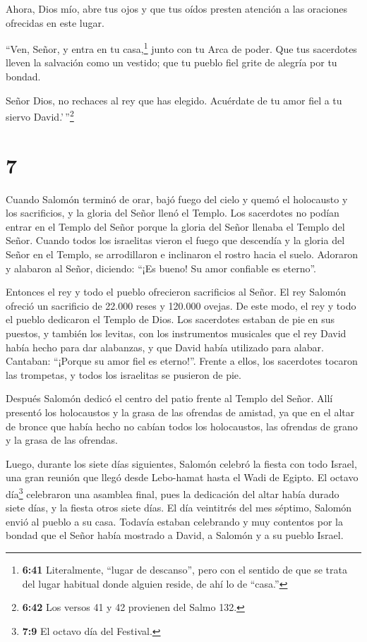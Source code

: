  Ahora, Dios mío, abre tus ojos y que tus oídos presten
atención a las oraciones ofrecidas en este lugar.

 ``Ven, Señor, y entra en tu casa,\footnote{\textbf{6:41}
  Literalmente, ``lugar de descanso'', pero con el sentido de que se
  trata del lugar habitual donde alguien reside, de ahí lo de ``casa.''}
junto con tu Arca de poder. Que tus sacerdotes lleven la salvación como
un vestido; que tu pueblo fiel grite de alegría por tu bondad.

 Señor Dios, no rechaces al rey que has elegido. Acuérdate
de tu amor fiel a tu siervo David.'\,''\footnote{\textbf{6:42} Los
  versos 41 y 42 provienen del Salmo 132.}

\hypertarget{section-6}{%
\section{7}\label{section-6}}

 Cuando Salomón terminó de orar, bajó fuego del cielo y
quemó el holocausto y los sacrificios, y la gloria del Señor llenó el
Templo.  Los sacerdotes no podían entrar en el Templo del
Señor porque la gloria del Señor llenaba el Templo del Señor.
 Cuando todos los israelitas vieron el fuego que descendía y
la gloria del Señor en el Templo, se arrodillaron e inclinaron el rostro
hacia el suelo. Adoraron y alabaron al Señor, diciendo: ``¡Es bueno! Su
amor confiable es eterno''.

 Entonces el rey y todo el pueblo ofrecieron sacrificios al
Señor.  El rey Salomón ofreció un sacrificio de 22.000 reses
y 120.000 ovejas. De este modo, el rey y todo el pueblo dedicaron el
Templo de Dios.  Los sacerdotes estaban de pie en sus
puestos, y también los levitas, con los instrumentos musicales que el
rey David había hecho para dar alabanzas, y que David había utilizado
para alabar. Cantaban: ``¡Porque su amor fiel es eterno!''. Frente a
ellos, los sacerdotes tocaron las trompetas, y todos los israelitas se
pusieron de pie.

 Después Salomón dedicó el centro del patio frente al Templo
del Señor. Allí presentó los holocaustos y la grasa de las ofrendas de
amistad, ya que en el altar de bronce que había hecho no cabían todos
los holocaustos, las ofrendas de grano y la grasa de las ofrendas.

 Luego, durante los siete días siguientes, Salomón celebró
la fiesta con todo Israel, una gran reunión que llegó desde Lebo-hamat
hasta el Wadi de Egipto.  El octavo día\footnote{\textbf{7:9}
  El octavo día del Festival.} celebraron una asamblea final, pues la
dedicación del altar había durado siete días, y la fiesta otros siete
días.  El día veintitrés del mes séptimo, Salomón envió al
pueblo a su casa. Todavía estaban celebrando y muy contentos por la
bondad que el Señor había mostrado a David, a Salomón y a su pueblo
Israel.


